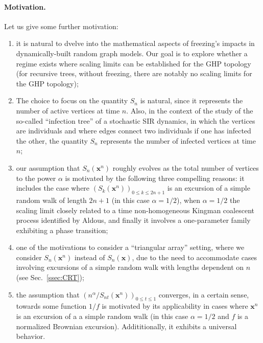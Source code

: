 \documentclass[11pt]{article}
\theoremstyle{plain}
\theoremstyle{definition}
\theoremstyle{remark}
\newcommand{\1}{\mathbbm{1}} %
\newcommand{\Xb}{\mathrm{\mathbf{x}}} %
\begin{document}
\paragraph{{Motivation.}} {Let us give some further motivation:
\begin{enumerate}
\item[--] it is natural to dvelve into the mathematical aspects of freezing's impacts in dynamically-built random graph models. Our goal is to explore whether a regime exists where scaling limits can be established for the GHP topology (for recursive trees, without freezing, there are notably no scaling limits for the GHP topology);
\item[--] The choice to focus on the quantity $S_{n}$ is natural, since it represents the number of active vertices at time $n$. Also, in the context of the study of the so-called ``infection tree'' of a stochastic SIR dynamics, in which the vertices are individuals and where edges connect two individuals if one has infected the other, the quantity $S_{n}$ represents the number of infected vertices at time $n$;
\item[--] our assumption  that $S_{n}(\Xb^{n})$ roughly evolves  as the total number of vertices to the power $\alpha$ is motivated by the following three compelling reasons: it includes the case where $(S_k(\Xb^{n}))_{0 \le k \le 2n+1}$ is an excursion of a simple random walk of length $2n+1$ (in this case $\alpha=1/2$), when $\alpha=1/2$ the scaling limit closely related to a time non-homogeneous Kingman coalescent process identified by Aldous, and finally it involves a one-parameter family exhibiting  a phase transition;
\item[--] one of the motivations to consider a ``triangular array'' setting, where we consider $S_{n}(\Xb^{n})$ instead of $S_{n}(\Xb)$, due to the need to accommodate cases involving excursions of a simple random walk with lengths dependent on $n$ {(see Sec.~\ref{ssec:CRT})};
\item[--] the assumption that $\displaystyle (n^{\alpha}/S_{nt}(\Xb^n))_{0 \leq t \leq 1}$ converges, in a certain sense, towards some function $1/f$ is motivated by its applicability in cases where  $\Xb^{n}$ is an excursion of a a simple random walk (in this case $\alpha=1/2$ and $f$ is a normalized Brownian excursion). Addititionally,  it exhibits a universal behavior.
\end{enumerate}
}


 
 
\end{document}
